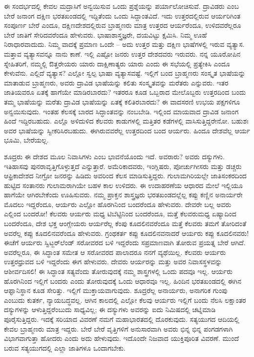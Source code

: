ಈ ಸಂದರ್ಭದಲ್ಲಿ ಕೇವಲ ಮದ್ರಾಸಿಗೆ ಅನ್ವಯಿಸುವ ಒಂದು ಪ್ರಶ್ನೆಯನ್ನು ಪರ್ಯಾಲೋಚಿಸುವೆ. ದ್ರಾವಿಡರು ಎಂಬ ಬೇರೆ ಜನಾಂಗ ದಕ್ಷಿಣ ಭರತಖಂಡದಲ್ಲಿ ಇದ್ದಿತೆಂದು ಒಂದು ಸಿದ್ದಾಂತವಿದೆ. ಇದು ಉತ್ತರದಲ್ಲಿರುವ ಆರ್ಯರಿಗಿಂತ ಸಂಪೂರ್ಣ ಬೇರೆ ಎಂದೂ, ದಕ್ಷಿಣದೇಶದಲ್ಲಿರುವ ಬ್ರಾಹ್ಮಣರು ಮಾತ್ರ ಉತ್ತರದ ಆರ್ಯರೆಂದೂ, ಉಳಿದವರೆಲ್ಲರೂ ಬೇರೆ ಜಾತಿಗೆ ಸೇರಿದವರೆಂದೂ ಹೇಳುವರು. ಭಾಷಾಶಾಸ್ತ್ರಜ್ಞರೇ, ದಯವಿಟ್ಟು ಕ್ಷಮಿಸಿ. ನಿಮ್ಮ ಊಹೆ ನಿರಾಧಾರವಾದುದು. ನಿಮ್ಮ ವಾದಕ್ಕೆ ಪ್ರಮಾಣ ಒಂದೇ – ಅದು ಉತ್ತರ ಮತ್ತು ದಕ್ಷಿಣ ಭಾಷೆಗಳಲ್ಲಿ ಇರುವ ವ್ಯತ್ಯಾಸ. ಮತ್ತಾವ ವ್ಯತ್ಯಾಸವನ್ನೂ ನಾನು ಕಾಣೆ. ಇಲ್ಲಿ ಎಷ್ಟೋ ಜನರು ಉತ್ತರ ದೇಶದವರು ಇರುವರು. ನನ್ನ ಯೂರೋಪಿನ ಸ್ನೇಹಿತರಿಗೆ, ನಮ್ಮಲ್ಲಿ ಔತ್ತರೇಯರು ಯಾರು ದಾಕ್ಷಿಣಾತ್ಯರು ಯಾರು ಎಂದು ಈ ಸಭೆಯಲ್ಲಿ ಪ್ರತ್ಯೇಕಿಸಿ ಎಂದೂ ಕೇಳುವೆನು. ಎಲ್ಲಿದೆ ವ್ಯತ್ಯಾಸ? ಎಲ್ಲೋ ಸ್ವಲ್ಪ ಭಾಷಾ ವ್ಯತ್ಯಾಸವಷ್ಟೆ. ಇಲ್ಲಿಗೆ ಬಂದ ಬ್ರಾಹ್ಮಣರು ಸಂಸ್ಕೃತ ಭಾಷೆಯನ್ನು ಮಾತಾಡುವ ಬ್ರಾಹ್ಮಣರು, ಅವರು ದ್ರಾವಿಡ ಭಾಷೆಯನ್ನು ಕಲಿತು ಸಂಸ್ಕೃತವನ್ನು ಮರೆತರು ಎನ್ನುವರು. ಇತರ ಜಾತಿಯವರೂ ಏತಕ್ಕೆ ಹಾಗೆಯೇ ಮಾಡಿರಬಾರದು? ಇತರರೂ ಕೂಡ ಒಬ್ಬರಾದ ಮೇಲೊಬ್ಬರು ಉತ್ತರದಿಂದ ಬಂದು ತಮ್ಮ ಭಾಷೆಯನ್ನು ಮರೆತು ದ್ರಾವಿಡ ಭಾಷೆಯನ್ನು ಏತಕ್ಕೆ ಕಲಿತಿರಬಾರದು? ಈ ವಾದಸರಣಿ ಉಭಯ ಪಕ್ಷಗಳಿಗೂ ಅನ್ವಯಿಸುವುದು. ಇಂತಹ ಕೆಲಸಕ್ಕೆ ಬಾರದ ಸಿದ್ಧಾಂತವನ್ನು ನಂಬಬೇಡಿ. ಇಲ್ಲಿಂದ ಮಾಯವಾದ ದ್ರಾವಿಡ ಜನಾಂಗ ಹಿಂದೆ ಇದ್ದಿರಬಹುದು. ಎಲ್ಲೊ ಅಳಿದುಳಿದ ಕೆಲವರು ಕಾಡುಗಳಲ್ಲಿ ಮತ್ತಿತರ ಕಡೆಗಳಲ್ಲಿ ವಾಸಿಸುತ್ತಿದ್ದರೇನೋ. ಬಹುಶಃ ಅವರ ಭಾಷೆಯನ್ನು ಸ್ವೀಕರಿಸಿರಬಹುದು. ಈಗಿರುವವರೆಲ್ಲ ಉತ್ತರದಿಂದ ಬಂದ ಆರ್ಯರು. ಹಿಂದೂ ದೇಶವೆಲ್ಲ ಆರ್ಯ ಭೂಮಿ, ಬೇರೆಯಲ್ಲ. 

ಶೂದ್ರರು ಈ ದೇಶದ ಮೂಲ ನಿವಾಸಿಗಳು ಎಂಬ ಭಾವನೆಯೊಂದು ಇದೆ. ಅವರಾರು? ಅವರು ದಸ್ಯುಗಳು. ಇತಿಹಾಸವು ಪುನರಾವೃತ್ತಿಗೊಳ್ಳುತ್ತದೆ ಎನ್ನುತ್ತಾರೆ. ಅಮೆರಿಕಾದವರು, ಇಂಗ್ಲಿಷರು, ಪೋರ್ಚುಗೀಸರು ಮತ್ತು ಡಚ್ಚರು ಆಫ್ರಿಕಾದೇಶದ ನೀಗ್ರೋ ಜನರನ್ನು ಹಿಡಿದು ಅವರಿಂದ ಕೆಲಸ ಮಾಡಿಸುತ್ತಿದ್ದರು. ಗುಲಾಮಗಿರಿಯಲ್ಲೇ ಜಾತಿಸಂಕರದಿಂದ ಹುಟ್ಟಿದ ಸಂತಾನರು ಗುಲಾಮರಾಗಿಯೇ ಬಹಳ ಕಾಲ ಉಳಿದರು. ಈ ಉದಾಹರಣೆಯ ಆಧಾರದ ಮೇಲೆ ಇಲ್ಲಿಯೂ ಹಾಗೆಯೇ ಆಗಿರಬೇಕೆಂದು ಊಹಿಸುವರು. ನಮ್ಮ ಪ್ರಾಕ್ತನ ಶಾಸ್ತ್ರಜ್ಞರು ಭರತಖಂಡದಲ್ಲೆಲ್ಲ ಕಪ್ಪು ಕಣ್ಣಿನ ಅನಾರ್ಯರೇ ಮೊದಲು ಇದ್ದರೆಂದೂ, ಆರ್ಯರು ಎಲ್ಲೋ ಹೊರಗಿನಿಂದ ಬಂದರೆಂದೂ ಹೇಳುವರು. ದೇವರೇ ಬಲ್ಲ ಅವರು ಎಲ್ಲಿಂದ ಬಂದರೋ! ಕೆಲವರು ಆರ್ಯರು ಮಧ್ಯ ಟಿಬೆಟ್ಟಿನಿಂದ ಬಂದರೆಂದೂ, ಮತ್ತೆ ಕೆಲವರುಮಧ್ಯ ಏಷ್ಯಾದಿಂದ ಬಂದರೆಂದೂ, ದೇಶ ಭಕ್ತ ಆಂಗ್ಲೇಯರು ಆರ್ಯರೆಲ್ಲ ಕೆಂಪು ಕೂದಲಿನವರೆಂದೂ ಮತ್ತೆ ಕೆಲವರು ತಮಗೆ ತೋರಿದಂತೆ ಅವರೆಲ್ಲ ಕಪ್ಪು ಕೂದಲಿನವರೆಂದೂ ಹೇಳುವರು. ಗ್ರಂಥಕರ್ತ ಕಪ್ಪು ಕೂದಲಿನವನಾದರೆ ಆರ್ಯರು ಕಪ್ಪು ಕೂದಲಿನವರು! ಈಚೆಗೆ ಆರ್ಯರು ಸ್ವಿಟ್ಜರ್​ಲೆಂಡ್​ ಸರೋವರದ ಬಳಿ ಇದ್ದರೆಂದು ಸಪ್ರಮಾಣವಾಗಿ ತೋರುವ ಪ್ರಯತ್ನ ಬೇರೆ ಆಗಿದೆ. ಅವರೆಲ್ಲರೂ, ಈ ಸಿದ್ಧಾಂತ ಸಮೇತ ಆ ಸರೋವರದ ಪಾಲಾದರೂ ನನಗೆ ವ್ಯಥೆಯಿಲ್ಲ. ಕೆಲವರು ಆರ್ಯರು ಉತ್ತರಧ್ರುವದ ಬಳಿ ಇದ್ದರೆಂದು ಈಗ ಹೇಳುವರು. ದೇವರು ಆರ್ಯರನ್ನು ಮತ್ತು ಅವರ ನಿವಾಸಸ್ಥಳವನ್ನು ಆಶೀರ್ವದಿಸಲಿ! ಈ ಸಿದ್ಧಾಂತ ಸತ್ಯವೆಂದು ತೋರುವುದಕ್ಕೆ ನಮ್ಮ ಶಾಸ್ತ್ರಗಳಲ್ಲಿ ಒಂದು ಪದವೂ ಇಲ್ಲ. ಆರ್ಯರು ಹೊರಗಿನಿಂದ ಇಲ್ಲಿಗೆ ಬಂದರು ಎಂದು ತೋರುವುದಕ್ಕೆ ಒಂದು ಆಧಾರವೂ ಇಲ್ಲ. ಹಿಂದಿನ ಭರತಖಂಡದಲ್ಲಿ ಈಗಿನ ಆಫ್ಘಾನಿಸ್ಥಾನ ಕೂಡ ಸೇರಿತ್ತು. ಇಲ್ಲಿಗೆ ಮುಕ್ತಾಯವಾಗುವುದು. ಶೂದ್ರರೆಲ್ಲ ಅನಾರ್ಯರು, ಅನಾಗರಿಕ ಗುಂಪು ಎಂಬುದು ಕುತರ್ಕ, ನ್ಯಾಯಬದ್ಧವಲ್ಲ. ಆಗಿನ ಕಾಲದಲ್ಲಿ ಎಲ್ಲೋ ಕೆಲವು ಆರ್ಯರು ಇಲ್ಲಿಗೆ ಬಂದು ನೆಲಸಿ ಲಕ್ಷಾಂತರ ದಸ್ಯುಗಳನ್ನು ಆಳುತ್ತಿದ್ದರೆಂಬುದು ಸಾಧ್ಯವಿಲ್ಲ; ಈ ದಸ್ಯುಗಳು ಅವರನ್ನು ಐದು ನಿಮಿಷದಲ್ಲಿ ಚಟ್ನಿಮಾಡಿ ಪೂರೈಸುತ್ತಿದ್ದರು. ಇದಕ್ಕೆ ಸರಿಯಾದ ವಿವರಣೆ ನಮಗೆ ಮಹಾಭಾರತದಲ್ಲಿ ದೊರಕುವುದು. ಸತ್ಯಯುಗದ ಆದಿಯಲ್ಲಿ ಕೇವಲ ಬ್ರಾಹ್ಮಣರು ಮಾತ್ರ ಇದ್ದರು. ಬೇರೆ ಬೇರೆ ವೃತ್ತಿಗಳಿಗೆ ಅನುಸಾರವಾಗಿ ಅವರು ಭಿನ್ನ ಭಿನ್ನ ಪಂಗಡಗಳಾಗಿ ವಿಭಾಗವಾಗುತ್ತಾ ಹೋದರು ಎಂದು ಅದು ಹೇಳುವುದು. ಇದೊಂದೇ ನಿಜವಾದ ಯುಕ್ತಿಪೂರಿತ ವಿವರಣೆ. ಮುಂದೆ ಬರುವ ಸತ್ಯಯುಗದಲ್ಲಿ ಎಲ್ಲಾ ಜಾತಿಗಳೂ ಒಂದಾಗಬೇಕು. 

